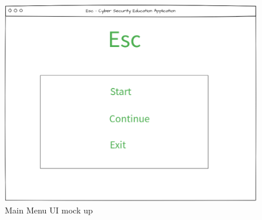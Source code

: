 \documentclass[12pt,a4paper]{article}
\begin{document}
\begin{figure}[h]
    \centering
    \includegraphics[width=1.0\textwidth]{Ui_main_menu.PNG} 
    \caption{Main Menu UI mock up}
\end{figure}   
\end{document}
